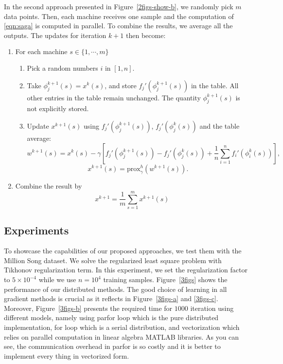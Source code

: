 \documentclass[a4paper,11pt]{article}
\newcommand{\prox}{\textrm{prox}}
\begin{document}
In the second approach presented in Figure~\ref{2figs-show-b}, we randomly pick $m$ data points. Then, each machine receives one sample and the computation of \eqref{eqn:saga} is computed in parallel. To combine the results, we average all the outputs. The updates for iteration $k+1$ then become:
\begin{enumerate}	
	\item For each machine $s \in \{ 1, \cdots, m \}$
	\begin{enumerate}
		\item Pick a random numbers $i$ in $[1, n]$.
		\item Take $\phi_j^{k+1}(s) = x^k(s)$, and store $f_j'(\phi_j^{k+1}(s))$ in the table.
		All other entries in the table remain unchanged. The quantity $\phi_j^{k+1}(s)$
		is not explicitly stored.
		\item Update $x^{k+1}(s)$ using $f_j'(\phi_j^{k+1}(s))$, $f_j'(\phi_j^k(s))$ and the table
		average:
		\begin{equation}
		w^{k+1}(s) = x^k(s) - \gamma \left[ f_j'(\phi_j^{k+1}(s)) - f_j'(\phi_j^k(s))
		+ \frac1n \sum_{i=1}^n f_i'(\phi_i^k(s)) \right] ,
		\end{equation}
		$$x^{k+1}(s) = \prox_\gamma^h (w^{k+1}(s)).$$
	\end{enumerate}
	\item Combine the result by
	$$ x^{k+1} = \frac{1}{m} \sum_{s=1}^m x^{k+1}(s) $$
\end{enumerate}

\subsection{Experiments}

To showcase the capabilities of our proposed approaches, we test them with the Million Song dataset. We solve the regularized least square problem with Tikhonov regularization term. In this experiment, we set the regularization factor to $5\times 10^{-4}$ while we use $n=10^4$ training samples. Figure~\ref{3figs} shows the performance of our distributed methods. The good choice of learning in all gradient methods is crucial as it reflects in Figure~\ref{3figs-a} and \ref{3figs-c}. Moreover, Figure~\ref{3figs-b} presents the required time for $1000$ iteration using different models, namely using parfor loop which is the pure distributed implementation, for loop which is a serial distribution, and vectorization which relies on parallel computation in linear algebra MATLAB libraries. As you can see, the communication overhead in parfor is so costly and it is better to implement every thing in vectorized form.
\end{document}
